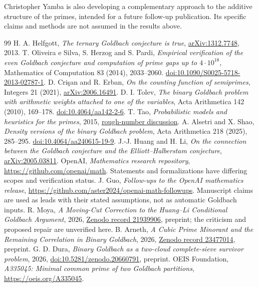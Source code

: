 \documentclass[11pt,a4paper]{article}
\begin{document}
Christopher Yamba is also developing a complementary approach to the additive structure of the primes, intended for a future follow-up publication. Its specific claims and methods are not assumed in the results above.

\clearpage
\begin{thebibliography}{99}\small\setlength{\itemsep}{0pt}\setlength{\parskip}{0pt}
 H. A. Helfgott, \emph{The ternary Goldbach conjecture is true}, \href{https://arxiv.org/abs/1312.7748}{arXiv:1312.7748}, 2013.
 T. Oliveira e Silva, S. Herzog and S. Pardi, \emph{Empirical verification of the even Goldbach conjecture and computation of prime gaps up to $4\cdot10^{18}$}, Mathematics of Computation 83 (2014), 2033--2060. \href{https://doi.org/10.1090/S0025-5718-2013-02787-1}{doi:10.1090/S0025-5718-2013-02787-1}.
 D. Cri\c san and R. Erban, \emph{On the counting function of semiprimes}, Integers 21 (2021), \href{https://arxiv.org/abs/2006.16491}{arXiv:2006.16491}.
 D. I. Tolev, \emph{The binary Goldbach problem with arithmetic weights attached to one of the variables}, Acta Arithmetica 142 (2010), 169--178. \href{https://doi.org/10.4064/aa142-2-6}{doi:10.4064/aa142-2-6}.
 T. Tao, \emph{Probabilistic models and heuristics for the primes}, 2015, \href{https://terrytao.wordpress.com/2015/01/04/254a-supplement-4-probabilistic-models-and-heuristics-for-the-primes-optional/}{rough-number discussion}.
 A. Alsetri and X. Shao, \emph{Density versions of the binary Goldbach problem}, Acta Arithmetica 218 (2025), 285--295. \href{https://doi.org/10.4064/aa240615-19-9}{doi:10.4064/aa240615-19-9}.
 J.-J. Huang and H. Li, \emph{On the connection between the Goldbach conjecture and the Elliott--Halberstam conjecture}, \href{https://arxiv.org/abs/2005.03811}{arXiv:2005.03811}.
 OpenAI, \emph{Mathematics research repository}, \url{https://github.com/openai/math}. Statements and formalizations have differing scopes and verification status.
 J. Guo, \emph{Follow-ups to the OpenAI mathematics release}, \url{https://github.com/aster2024/openai-math-followups}. Manuscript claims are used as leads with their stated assumptions, not as automatic Goldbach inputs.
 R. Moya, \emph{A Moving-Cut Correction to the Huang--Li Conditional Goldbach Argument}, 2026, \href{https://zenodo.org/records/21939906}{Zenodo record 21939906}, preprint; the criticism and proposed repair are unverified here.
 B. Arneth, \emph{A Cubic Prime Minorant and the Remaining Correlation in Binary Goldbach}, 2026, \href{https://zenodo.org/records/23477014}{Zenodo record 23477014}, preprint.
 G. D. Dura, \emph{Binary Goldbach as a two-cloud complete-sieve survivor problem}, 2026, \href{https://doi.org/10.5281/zenodo.20660791}{doi:10.5281/zenodo.20660791}, preprint.
 OEIS Foundation, \emph{A335045: Minimal common prime of two Goldbach partitions}, \url{https://oeis.org/A335045}.
\end{thebibliography}
\end{document}
